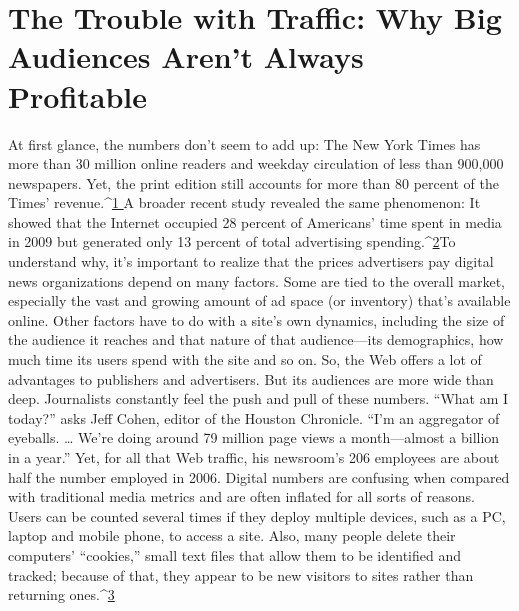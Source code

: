 \chapter{The Trouble with Traffic: Why Big Audiences Aren’t Always Profitable}
At first glance, the numbers don’t seem to add up: The New York Times
has more than 30 million online readers and weekday circulation of less than
900,000 newspapers. Yet, the print edition still accounts for more than 80 percent
of the Times’ revenue.^{\href{#endnotes-ch2}{1 }}A broader recent study revealed the same phenomenon: It
showed that the Internet occupied 28 percent of Americans’ time spent in media
in 2009 but generated only 13 percent of total advertising spending.^{\href{#endnotes-ch2}{2}}To understand why, it’s important to realize that the prices advertisers pay
digital news organizations depend on many factors. Some are tied to the overall
market, especially the vast and growing amount of ad space (or inventory) that’s
available online. Other factors have to do with a site’s own dynamics, including
the size of the audience it reaches and that nature of that audience—its demographics,
how much time its users spend with the site and so on.
So, the Web offers a lot of advantages to publishers and advertisers. But its audiences
are more wide than deep.
Journalists constantly feel the push and pull of these numbers. ``What am I
today?'' asks Jeff Cohen, editor of the Houston Chronicle. ``I’m an aggregator
of eyeballs. … We’re doing around 79 million page views a month—almost a
billion in a year.'' Yet, for all that Web traffic, his newsroom’s 206 employees are
about half the number employed in 2006.
Digital numbers are confusing when compared with traditional media metrics
and are often inflated for all sorts of reasons. Users can be counted several times
if they deploy multiple devices, such as a PC, laptop and mobile phone, to access
a site. Also, many people delete their computers’ ``cookies,'' small text files that
allow them to be identified and tracked; because of that, they appear to be new
visitors to sites rather than returning ones.^{\href{#endnotes-ch2}{3}}%

